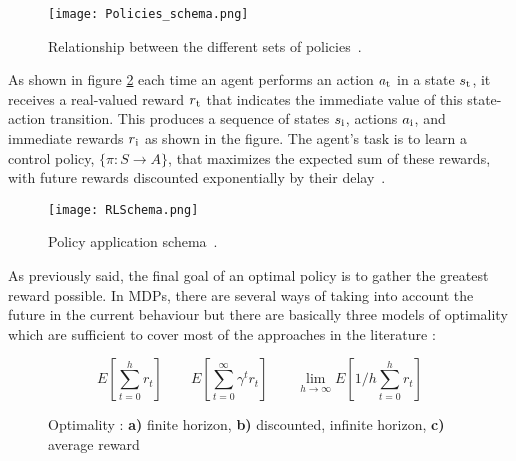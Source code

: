 \begin{figure}[h!]
	\centering
	\texttt{[image: Policies\_schema.png]}
	\caption{Relationship between the different sets of policies~\cite{Sigaud:2010:MDP:1841781}.}
	\label{fig:Policies_schema}
\end{figure}

As shown in figure \ref{fig:Policy_application_schema} each time an agent performs an action $a\textsubscript{t}$ in a state $s\textsubscript{t}$, it receives a real-valued reward $r\textsubscript{t}$ that indicates the immediate value of this state-action transition. This produces a sequence of states $s\textsubscript{i}$, actions $a\textsubscript{i}$, and immediate rewards $r\textsubscript{i}$ as shown in the figure. The agent's task is to learn a control policy, $\{\pi : S \longrightarrow A\}$, that maximizes the expected sum of these rewards, with future rewards discounted exponentially by their delay~\cite{Mitchell}.

\begin{figure}[h!]
	\centering
	\texttt{[image: RLSchema.png]}
	\caption{Policy application schema~\cite{SuttonBarto}.}
	\label{fig:Policy_application_schema}
\end{figure}
 
As previously said, the final goal of an optimal policy is to gather the greatest reward possible. In MDPs, there are several ways of taking into account the future in the current behaviour but there are basically three models of optimality which are sufficient to cover most of the approaches in the literature :

\begin{figure}[h!]
\begin{equation*}
E[\sum_{t = 0}^h r_t]
\qquad
E[\sum_{t = 0}^\infty \gamma^t r_t]
\qquad
\lim\limits_{h \rightarrow \infty} E[1/h \sum_{t = 0}^h r_t]
\end{equation*}
\caption{Optimality : \textbf{a)} finite horizon, \textbf{b)} discounted, infinite horizon, \textbf{c)} average reward}
\end{figure}

